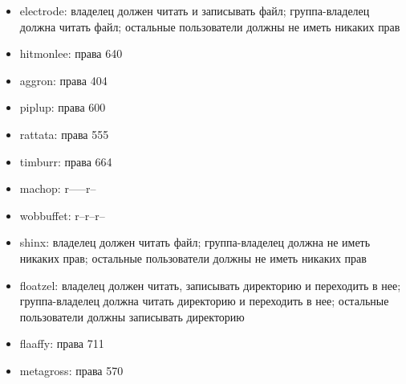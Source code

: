 \documentclass{article}
\begin{document}
\begin{itemize}
  \item electrode: владелец должен читать и записывать файл; группа-владелец должна читать файл; остальные пользователи должны не иметь никаких прав
  \item hitmonlee: права 640
  \item aggron: права 404
  \item piplup: права 600
  \item rattata: права 555
  \item timburr: права 664
  \item machop: r-----r--
  \item wobbuffet: r--r--r--
  \item shinx: владелец должен читать файл; группа-владелец должна не иметь никаких прав; остальные пользователи должны не иметь никаких прав
  \item floatzel: владелец должен читать, записывать директорию и переходить в нее; группа-владелец должна читать директорию и переходить в нее; остальные пользователи должны записывать директорию
  \item flaaffy: права 711
  \item metagross: права 570
\end{itemize}
\end{document}
